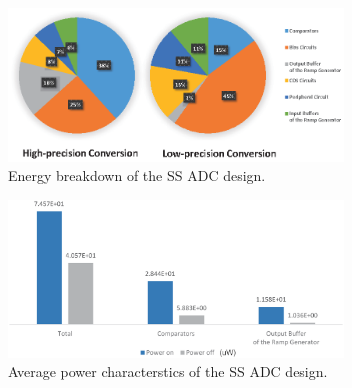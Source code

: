\begin{figure}[htbp]
	\centerline{\includegraphics[width=3.5in]{./Figures/SSResults1.eps}}
	\caption{Energy breakdown of the SS ADC design.}
	\label{SSresults1}
\end{figure}

\begin{figure}[htbp]
	\centerline{\includegraphics[width=3.5in]{./Figures/SSResults2.eps}}
	\caption{Average power characterstics of the SS ADC design.}
	\label{SSresults2}
\end{figure} 

